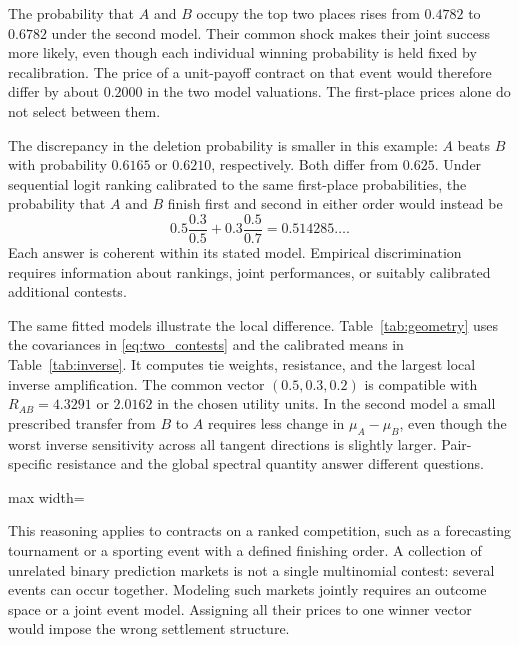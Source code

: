 \documentclass[11pt]{amsart}
\theoremstyle{definition}
\begin{document}
The probability that $A$ and $B$ occupy the top two places rises from $0.4782$ to $0.6782$ under the second model. Their common shock makes their joint success more likely, even though each individual winning probability is held fixed by recalibration. The price of a unit-payoff contract on that event would therefore differ by about $0.2000$ in the two model valuations. The first-place prices alone do not select between them.

The discrepancy in the deletion probability is smaller in this example: $A$ beats $B$ with probability $0.6165$ or $0.6210$, respectively. Both differ from $0.625$. Under sequential logit ranking calibrated to the same first-place probabilities, the probability that $A$ and $B$ finish first and second in either order would instead be
\[
 0.5\frac{0.3}{0.5}+0.3\frac{0.5}{0.7}=0.514285\ldots.
\]
Each answer is coherent within its stated model. Empirical discrimination requires information about rankings, joint performances, or suitably calibrated additional contests.

The same fitted models illustrate the local difference. Table~\ref{tab:geometry}
uses the covariances in \eqref{eq:two_contests} and the calibrated means in
Table~\ref{tab:inverse}. It computes tie weights, resistance, and the largest
local inverse amplification. The common vector $(0.5,0.3,0.2)$ is compatible
with $R_{AB}=4.3291$ or $2.0162$ in the chosen utility units. In the second
model a small prescribed transfer from $B$ to $A$ requires less change in
$\mu_A-\mu_B$, even though the worst inverse sensitivity across all tangent
directions is slightly larger. Pair-specific resistance and the global
spectral quantity answer different questions.

\begin{table}[ht]
\centering
\caption{Local geometry at the same winner probabilities $(0.5,0.3,0.2)$.
Both models have unit marginal shock variances. Weights are in inverse
utility units; resistance and inverse amplification are in utility units.}
\label{tab:geometry}
\begin{adjustbox}{max width=\textwidth}\end{adjustbox}
\end{table}

This reasoning applies to contracts on a ranked competition, such as a forecasting tournament or a sporting event with a defined finishing order. A collection of unrelated binary prediction markets is not a single multinomial contest: several events can occur together. Modeling such markets jointly requires an outcome space or a joint event model. Assigning all their prices to one winner vector would impose the wrong settlement structure.
\end{document}
